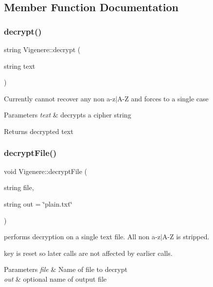 \subsection{Member Function Documentation}
\mbox{\label{classVigenere_a5b73ebb7eed8709e608da556ec3633fa}} 
\subsubsection{\texorpdfstring{decrypt()}{decrypt()}}
{\footnotesize\ttfamily string Vigenere\+::decrypt (\begin{DoxyParamCaption}\item[{string}]{text }\end{DoxyParamCaption})}

Currently cannot recover any non a-\/z$\vert$\+A-\/Z and forces to a single case


\begin{DoxyParams}{Parameters}
{\em text} & decrypts a cipher string \\
\hline
\end{DoxyParams}
\begin{DoxyReturn}{Returns}
decrypted text 
\end{DoxyReturn}
\mbox{\label{classVigenere_ad5a357194e5b113037f56adc0602f0b3}} 
\subsubsection{\texorpdfstring{decrypt\+File()}{decryptFile()}}
{\footnotesize\ttfamily void Vigenere\+::decrypt\+File (\begin{DoxyParamCaption}\item[{string}]{file,  }\item[{string}]{out = {\ttfamily \char`\"{}plain.txt\char`\"{}} }\end{DoxyParamCaption})}

performs decryption on a single text file. All non a-\/z$\vert$\+A-\/Z is stripped.

key is reset so later calls are not affected by earlier calls.


\begin{DoxyParams}{Parameters}
{\em file} & Name of file to decrypt \\
\hline
{\em out} & optional name of output file \\
\hline
\end{DoxyParams}
\mbox{\label{classVigenere_ae41574ecb94277c69204a8937a061b15}} 

